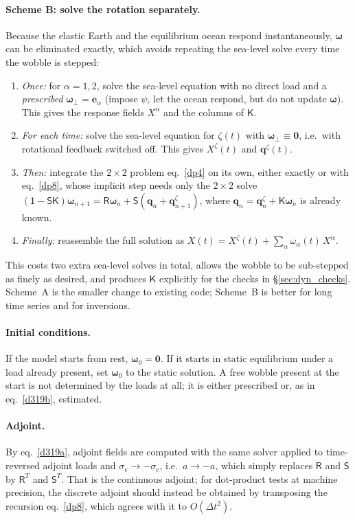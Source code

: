 \documentclass[11pt,a4paper]{article}
\newcommand{\bw}{\bm{\omega}}
\newcommand{\bq}{\mathbf{q}}
\newcommand{\Id}{\mathsf{1}}
\newcommand{\R}{\mathsf{R}}
\newcommand{\Sm}{\mathsf{S}}
\newcommand{\K}{\mathsf{K}}
\begin{document}
\paragraph{Scheme B: solve the rotation separately.} Because the elastic Earth and the equilibrium
ocean respond instantaneously, $\bw$ can be eliminated exactly, which avoids repeating the
sea-level solve every time the wobble is stepped:
\begin{enumerate}
  \item \emph{Once:} for $\alpha=1,2$, solve the sea-level equation with no direct load and a
  \emph{prescribed} $\bw_\perp=\mathbf{e}_\alpha$ (impose $\psi$, let the ocean respond, but do not
  update $\bw$). This gives the response fields $X^\alpha$ and the columns of $\K$.
  \item \emph{For each time:} solve the sea-level equation for $\zeta(t)$ with $\bw_\perp\equiv\mathbf{0}$,
  i.e.\ with rotational feedback switched off. This gives $X^\zeta(t)$ and $\bq^\zeta(t)$.
  \item \emph{Then:} integrate the $2\times2$ problem eq.~\eqref{dp4} on its own, either exactly or
  with eq.~\eqref{dp8}, whose implicit step needs only the $2\times2$ solve
  $(\Id-\Sm\K)\bw_{n+1}=\R\bw_n+\Sm(\bq_n+\bq^\zeta_{n+1})$, where $\bq_n=\bq^\zeta_n+\K\bw_n$ is
  already known.
  \item \emph{Finally:} reassemble the full solution as
  $X(t)=X^\zeta(t)+\sum_\alpha\omega_\alpha(t)\,X^\alpha$.
\end{enumerate}
This costs two extra sea-level solves in total, allows the wobble to be sub-stepped as finely as
desired, and produces $\K$ explicitly for the checks in \S\ref{sec:dyn_checks}. Scheme~A is the
smaller change to existing code; Scheme~B is better for long time series and for inversions.

\paragraph{Initial conditions.} If the model starts from rest, $\bw_0=\mathbf{0}$. If it starts in
static equilibrium under a load already present, set $\bw_0$ to the static solution. A free wobble
present at the start is not determined by the loads at all; it is either prescribed or, as in
eq.~\eqref{d319b}, estimated.

\paragraph{Adjoint.} By eq.~\eqref{d319a}, adjoint fields are computed with the same solver applied
to time-reversed adjoint loads and $\sigma_e\to-\sigma_e$, i.e.\ $a\to-a$, which simply replaces
$\R$ and $\Sm$ by $\R^T$ and $\Sm^T$. That is the continuous adjoint; for dot-product tests at
machine precision, the discrete adjoint should instead be obtained by transposing the recursion
eq.~\eqref{dp8}, which agrees with it to $O(\Delta t^2)$.
\end{document}
